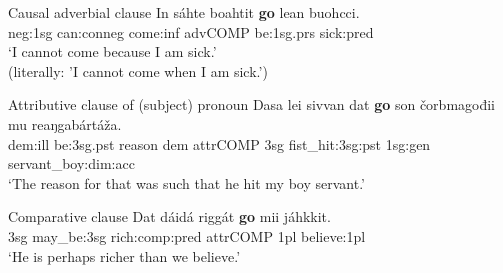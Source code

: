 \documentclass[a4,12pt]{scrartcl}
\begin{document}
\begin{exe}
	\ex Causal adverbial clause \label{goCausal}
\gll 	In 	sáhte 	boahtit 	{\bf go} 	lean 	buohcci.\\
	{\sc neg:1sg} can:{\sc conneg} come:{\sc inf} {\sc advCOMP} be:{\sc 1sg.prs} sick:{\sc pred}\\
\glt 	‘I cannot come because I am sick.’\\ (literally: 'I cannot come when I am sick.')%
\end{exe}

\begin{exe}

	\ex \label{goAttr} Attributive clause of (subject) pronoun \cite[439]{nickel1994}%
	\gll 	Dasa 	lei 	sivvan dat 	{\bf go} 	son 	čorbmagođii 	mu 	reaŋgabártáža.\\
	{\sc dem:ill} be:{\sc 3sg.pst} reason {\sc dem}  {\sc attrCOMP} {\sc 3sg} fist\_hit:{\sc 3sg:pst} {\sc 1sg:gen} servant\_boy:{\sc dim:acc}\\
	\glt 	‘The reason for that was such that he hit my boy servant.’ %

	\ex \label{goComp} Comparative clause \cite[199]{nickel1994} %
	\gll 	Dat 	dáidá 	riggát 	{\bf go} 	mii 	jáhkkit.\\
	{3sg}	may\_be:{\sc 3sg} rich:{comp:pred} {\sc attrCOMP} {\sc 1pl} believe:{\sc 1pl}\\
	\glt 	‘He is perhaps richer than we believe.’ %


\end{exe}
\end{document}
